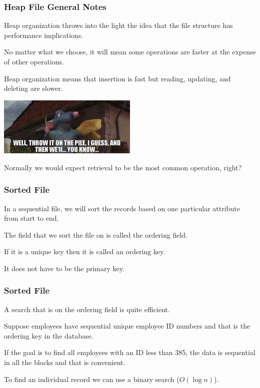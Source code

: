 \begin{frame}
\frametitle{Heap File General Notes}

Heap organization throws into the light the idea that the file structure has performance implications. 

No matter what we choose, it will mean some operations are faster at the expense of other operations. 

Heap organization means that insertion is fast but reading, updating, and deleting are slower. 

\begin{center}
	\includegraphics[width=0.5\textwidth]{images/pile.jpg}
\end{center}

Normally we would expect retrieval to be the most common operation, right?


\end{frame}

\begin{frame}
\frametitle{Sorted File}

In a sequential file, we will sort the records based on one particular attribute from start to end.

The field that we sort the file on is called the \alert{ordering field}. 

If it is a  unique key then it is called an \alert{ordering key}.

It does not have to be the primary key.

\end{frame}


\begin{frame}
\frametitle{Sorted File}

A search that is on the ordering field is quite efficient. 

Suppose employees have sequential unique employee ID numbers and that is the ordering key in the database. 

If the goal is to find all employees with an ID less than 385, the data is sequential in all the blocks and that is convenient.

To find an individual record we can use a binary search ($O(\log n)$).

\end{frame}



